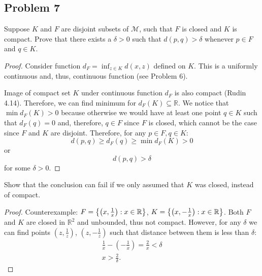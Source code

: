 \documentclass{article}
\newcommand{\R}{\mathbb{R}}
\DeclarePairedDelimiter{\set}{ \{ }{ \} }
\begin{document}
\subsection*{Problem 7}

\begin{tcolorbox}
Suppose $K$ and $F$ are disjoint subsets of $\mathcal{M}$, such that $F$ is closed and $K$ is compact. Prove that there exists a $\delta > 0$ such that $d (p, q) > \delta$ whenever $p \in F$ and $q \in K$.
\end{tcolorbox}

\begin{proof}

Consider function $d_F=\inf_{z \in K} d(x,z)$ defined on $K$.
This is a uniformly continuous and, thus, continuous function (see Problem 6).

Image of compact set $K$ under continuous function $d_F$ is also compact (Rudin 4.14).
Therefore, we can find minimum for $d_F(K) \subseteq \R$.
We notice that $\min d_F(K) > 0$ because otherwise we would have at least one point $q \in K$ such that $d_F(q) = 0$ and, therefore, $q \in F$ since $F$ is closed, which cannot be the case since $F$ and $K$ are disjoint.
Therefore, for any $p \in F, q \in K$:
\[ d(p,q) \geq d_F(q) \geq \min d_F(K) > 0 \]
or 
\[ d(p,q) > \delta \]
for some $\delta > 0$.

\end{proof}

\begin{tcolorbox}
 Show that the conclusion can fail if we only assumed that $K$ was closed, instead of compact.
\end{tcolorbox}

\begin{proof}

Counterexample: $F = \set*{ \left(x,\frac{1}{x}\right) : x\in\R }$, $K = \set*{ \left(x,-\frac{1}{x}\right) : x\in\R }$.
Both $F$ and $K$ are closed in $\R^2$ and unbounded, thus not compact.
However, for any $\delta$ we can find points $\left( z, \frac{1}{z} \right)$, $\left( z, -\frac{1}{z} \right)$ such that distance between them is less than $\delta$:
\begin{gather*}
    \frac{1}{x} - \left( - \frac{1}{x} \right) = \frac{2}{x} < \delta \\
    x > \frac{2}{\delta}.    
\end{gather*}


\end{proof}
\end{document}
